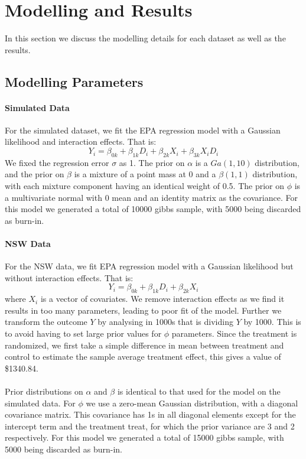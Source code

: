 \documentclass{article}
\begin{document}
\section{Modelling and Results}
In this section we discuss the modelling details for each dataset as well as the results. 

\subsection{Modelling Parameters}
\paragraph{Simulated Data}
For the simulated dataset, we fit the EPA regression model with a Gaussian likelihood and interaction effects. That is:
$$Y_i = \beta_{0k} + \beta_{1k}D_i + \beta_{2k}X_i + \beta_{3k}X_iD_i$$ We fixed the regression error $\sigma$ as 1. The prior on $\alpha$ is a $Ga(1,10)$ distribution, and the prior on $\beta$ is a mixture of a point mass at 0 and a $\beta(1,1)$ distribution, with each mixture component having an identical weight of 0.5. The prior on $\phi$ is a multivariate normal with 0 mean and an identity matrix as the covariance.  For this model we generated a total of 10000 gibbs sample, with 5000 being discarded as burn-in. 

\paragraph{NSW Data} For the NSW data, we fit EPA regression model with a Gaussian likelihood but without interaction effects. That is:
$$Y_i = \beta_{0k} + \beta_{1k}D_i + \beta_{2k}X_i$$ where $X_i$ is a vector of covariates. We remove interaction effects as we find it results in too many parameters, leading to poor fit of the model. Further we transform the outcome $Y$ by analysing in 1000s that is dividing $Y$ by 1000. This is to avoid having to set large prior values for $\phi$ parameters. Since the treatment is randomized, we first take a simple difference in mean between treatment and control to estimate the sample average treatment effect, this gives a value of \$1340.84.
\\ \\
Prior distributions on $\alpha$ and $\beta$ is identical to that used for the model on the simulated data. For $\phi$ we use a zero-mean Gaussian distribution, with a diagonal covariance matrix. This covariance has 1s in all diagonal elements except for the intercept term and the treatment treat, for which the prior variance are 3 and 2 respectively. For this model we generated a total of 15000 gibbs sample, with 5000 being discarded as burn-in. 
\end{document}
